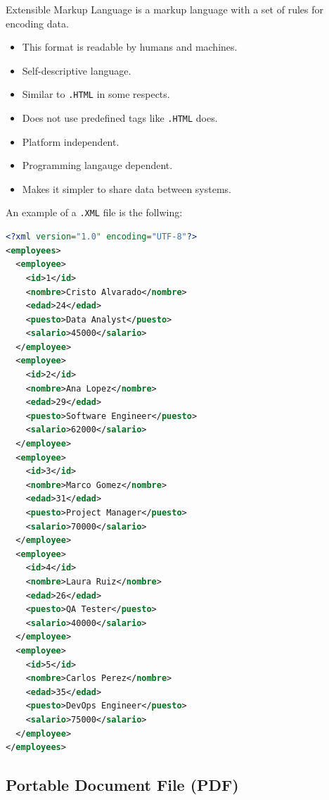 \documentclass[../../ibm_data_analysis.tex]{subfiles}
\begin{document}
    \begin{mydef}
        Extensible Markup Language is a markup language with a set of rules for encoding data.
        \begin{itemize}
            \item This format is readable by humans and machines.
            \item Self-descriptive language.
            \item Similar to \lstinline|.HTML| in some respects.
            \item Does not use predefined tags like \lstinline|.HTML| does.
            \item Platform independent.
            \item Programming langauge dependent.
            \item Makes it simpler to share data between systems. 
        \end{itemize}
    \end{mydef}

    \begin{exa}
        An example of a \lstinline|.XML| file is the follwing:

        \begin{lstlisting}[caption={\lstinline|.XML| File Content Example.},label=figure:XML_example, language = XML]
<?xml version="1.0" encoding="UTF-8"?>
<employees>
  <employee>
    <id>1</id>
    <nombre>Cristo Alvarado</nombre>
    <edad>24</edad>
    <puesto>Data Analyst</puesto>
    <salario>45000</salario>
  </employee>
  <employee>
    <id>2</id>
    <nombre>Ana Lopez</nombre>
    <edad>29</edad>
    <puesto>Software Engineer</puesto>
    <salario>62000</salario>
  </employee>
  <employee>
    <id>3</id>
    <nombre>Marco Gomez</nombre>
    <edad>31</edad>
    <puesto>Project Manager</puesto>
    <salario>70000</salario>
  </employee>
  <employee>
    <id>4</id>
    <nombre>Laura Ruiz</nombre>
    <edad>26</edad>
    <puesto>QA Tester</puesto>
    <salario>40000</salario>
  </employee>
  <employee>
    <id>5</id>
    <nombre>Carlos Perez</nombre>
    <edad>35</edad>
    <puesto>DevOps Engineer</puesto>
    <salario>75000</salario>
  </employee>
</employees>
        \end{lstlisting}

    \end{exa}

    \subsection{Portable Document File (PDF)}
\end{document}
